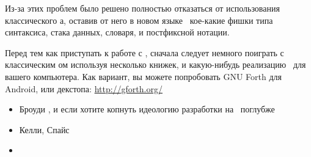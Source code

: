 \noindent
Из-за этих проблем было решено полностью отказаться от использования
классического \F а, оставив от него в новом языке \metal\ кое-какие фишки типа
синтаксиса, стака данных, словаря, и постфиксной нотации.

\clearpage
Перед тем как приступать к работе с \metal, сначала следует немного поиграть с
классическим \F ом используя несколько книжек, и какую-нибудь реализацию \F\ для
вашего компьютера. Как вариант, вы можете попробовать GNU Forth для Android, или
декстопа: \url{http://gforth.org/}

\begin{itemize}
  \item Броуди \cite{starting}, и \cite{thinking} если хотите копнуть идеологию
  разработки на \F\ поглубже
  \item Келли, Спайс \cite{kelly}
  \item 
\end{itemize}

\secup
